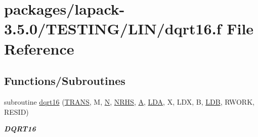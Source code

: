 \hypertarget{dqrt16_8f}{}\section{packages/lapack-\/3.5.0/\+T\+E\+S\+T\+I\+N\+G/\+L\+I\+N/dqrt16.f File Reference}
\label{dqrt16_8f}
\subsection*{Functions/\+Subroutines}
\begin{DoxyCompactItemize}
\item 
subroutine \hyperlink{group__double__lin_ga732090f9b672488f13e835c638005b4a}{dqrt16} (\hyperlink{superlu__enum__consts_8h_a0c4e17b2d5cea33f9991ccc6a6678d62a1f61e3015bfe0f0c2c3fda4c5a0cdf58}{T\+R\+A\+N\+S}, M, \hyperlink{polmisc_8c_a0240ac851181b84ac374872dc5434ee4}{N}, \hyperlink{example__user_8c_aa0138da002ce2a90360df2f521eb3198}{N\+R\+H\+S}, \hyperlink{classA}{A}, \hyperlink{example__user_8c_ae946da542ce0db94dced19b2ecefd1aa}{L\+D\+A}, X, L\+D\+X, B, \hyperlink{example__user_8c_a50e90a7104df172b5a89a06c47fcca04}{L\+D\+B}, R\+W\+O\+R\+K, R\+E\+S\+I\+D)
\begin{DoxyCompactList}\small\item\em {\bfseries D\+Q\+R\+T16} \end{DoxyCompactList}\end{DoxyCompactItemize}
